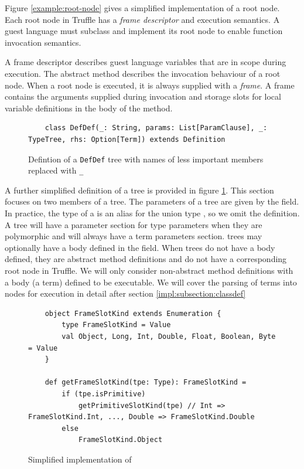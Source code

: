 Figure \ref{example:root-node} gives a simplified implementation of a root node.
Each root node in Truffle has a \textit{frame descriptor} and execution semantics.
A guest language must subclass and implement its root node to enable function invocation semantics.

A frame descriptor describes guest language variables that are in scope during execution.
The abstract  method describes the invocation behaviour of a root node.
When a root node is executed, it is always supplied with a \textit{frame}.
A frame contains the arguments supplied during invocation and storage slots for local variable definitions in the body of the method.

\begin{figure}[!htb]
	\begin{verbatim}
	class DefDef(_: String, params: List[ParamClause], _: TypeTree, rhs: Option[Term]) extends Definition	
	\end{verbatim}
	\caption{Defintion of a \texttt{DefDef} tree with names of less important members replaced with \texttt{\_}}
	\label{recall:defdef}
\end{figure}

A further simplified definition of a  tree is provided in figure \ref{recall:defdef}.
This section focuses on two members of a  tree.
The parameters of a  tree are given by the  field.
In practice, the type of a  is an alias for the union type , so we omit the  definition.
A  tree will have a parameter section for type parameters when they are polymorphic and will always have a term parameters section.
 trees may optionally have a body defined in the  field.
When trees do not have a body defined, they are abstract method definitions and do not have a corresponding root node in Truffle.
We will only consider non-abstract method definitions with a body (a term) defined to be executable.
We will cover the parsing of terms into nodes for execution in detail after section \ref{impl:subsection:classdef}

\begin{figure}[!htb]
	\begin{verbatim}
	object FrameSlotKind extends Enumeration {
		type FrameSlotKind = Value
		val Object, Long, Int, Double, Float, Boolean, Byte = Value
	}	
		
	def getFrameSlotKind(tpe: Type): FrameSlotKind = 
		if (tpe.isPrimitive) 
			getPrimitiveSlotKind(tpe) // Int => FrameSlotKind.Int, ..., Double => FrameSlotKind.Double
		else  
			FrameSlotKind.Object
	\end{verbatim}
	\caption{Simplified implementation of }
	\label{impl:frameslot-kind}
\end{figure}

